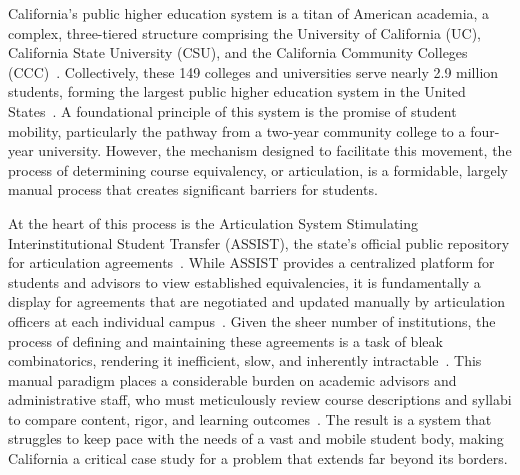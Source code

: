 
\begin{introduction}


California's public higher education system is a titan of American academia, a complex, three-tiered structure comprising the University of California (UC), California State University (CSU), and the California Community Colleges (CCC)~\cite{ppic}. Collectively, these 149 colleges and universities serve nearly 2.9 million students, forming the largest public higher education system in the United States~\cite{ppic,uc,calstate,cccco}. A foundational principle of this system is the promise of student mobility, particularly the pathway from a two-year community college to a four-year university. However, the mechanism designed to facilitate this movement, the process of determining course equivalency, or articulation, is a formidable, largely manual process that creates significant barriers for students.

At the heart of this process is the Articulation System Stimulating Interinstitutional Student Transfer (ASSIST), the state's official public repository for articulation agreements~\cite{assistinfo}. While ASSIST provides a centralized platform for students and advisors to view established equivalencies, it is fundamentally a display for agreements that are negotiated and updated manually by articulation officers at each individual campus~\cite{assistfaq}. Given the sheer number of institutions, the process of defining and maintaining these agreements is a task of bleak combinatorics, rendering it inefficient, slow, and inherently intractable~\cite{pardos2019}. This manual paradigm places a considerable burden on academic advisors and administrative staff, who must meticulously review course descriptions and syllabi to compare content, rigor, and learning outcomes~\cite{pardos2019}. The result is a system that struggles to keep pace with the needs of a vast and mobile student body, making California a critical case study for a problem that extends far beyond its borders.


\end{introduction}
